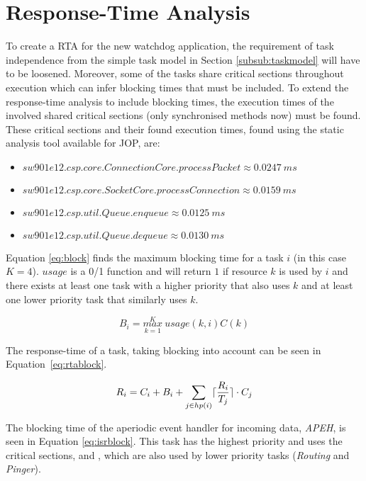 \section{Response-Time Analysis}
To create a RTA for the new watchdog application, the requirement of task independence from the simple task model in Section \ref{subsub:taskmodel} will have to be loosened. Moreover, some of the tasks share critical sections throughout execution which can infer blocking times that must be included. To extend the response-time analysis to include blocking times, the execution times of the involved shared critical sections (only synchronised methods now) must be found. These critical sections and their found execution times, found using the static analysis tool available for JOP, are:

\begin{itemize}
	\item $ sw901e12.csp.core.ConnectionCore.processPacket \approx 0.0247\ ms$
	\item $ sw901e12.csp.core.SocketCore.processConnection \approx 0.0159\ ms$
	\item $ sw901e12.csp.util.Queue.enqueue \approx 0.0125\ ms$
	\item $ sw901e12.csp.util.Queue.dequeue \approx 0.0130\ ms$
\end{itemize}

Equation \ref{eq:block} finds the maximum blocking time for a task $i$ (in this case $K=4$). $usage$ is a 0/1 function and will return $1$ if resource $k$ is used by $i$ and there exists at least one task with a higher priority that also uses $k$ and at least one lower priority task that similarly uses $k$.

\begin{equation}
\label{eq:block}
     B_{i} = \overset{K}{\underset{k=1}{max}}\ usage(k, i)C(k)
\end{equation}

The response-time of a task, taking blocking into account can be seen in Equation~\ref{eq:rtablock}\cite{alan2001real}.

\begin{equation}
\label{eq:rtablock}
     R_{i} = C_{i} + B_{i} + \sum\limits_{j\in hp(i)} \lceil\frac{R_{i}}{T_{j}}\rceil \cdot C_{j}
\end{equation}

The blocking time of the aperiodic event handler for incoming \iic data, \textit{APEH}, is seen in Equation \ref{eq:isrblock}. This task has the highest priority and uses the critical sections,  and , which are also used by lower priority tasks (\textit{Routing} and \textit{Pinger}).


